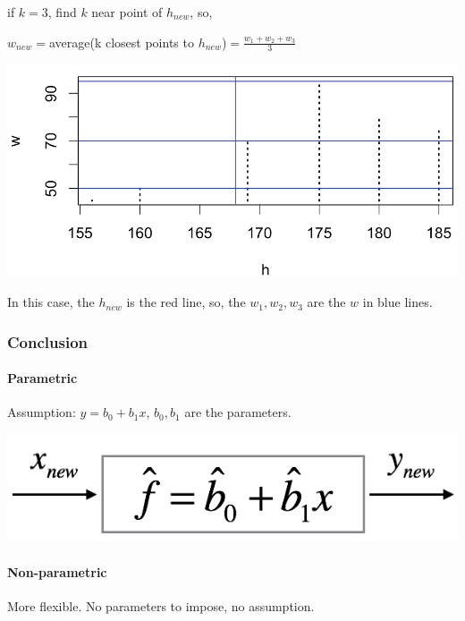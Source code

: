 \documentclass{article}
\begin{document}
{{{{            if $k=3$, find $k$ near point of $h_{new}$, so,\\
            \begin{center}{
                \(w_{new}=\)average(k closest points to \(h_{new}\))\(=\frac{w_1+w_2+w_3}{3}\)
            }
            \end{center}

            \begin{center}{
                \includegraphics[scale=0.5]{knn.png}
            }
            \end{center}

            In this case, the $h_{new}$ is the red line, so, the $w_1, w_2, w_3$ are the $w$ in blue lines.      
        }
        \subsubsection{Conclusion}{
            \paragraph{Parametric}{
                Assumption: $y = b_0 + b_1 x$, $b_0, b_1$ are the parameters.\\
                \begin{center}{
                    \includegraphics[scale=0.5]{parametric.png}
                }
                \end{center}
            }
            \paragraph{Non-parametric}{
                More flexible. No parameters to impose, no assumption. 
            }
        }
    }
}}
\end{document}
